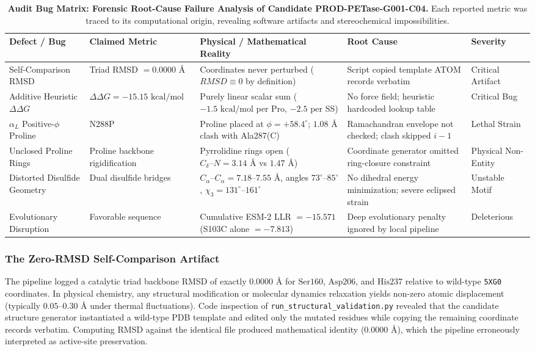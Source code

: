 \documentclass[10pt,twocolumn]{article}
\begin{document}
\begin{table}[t]
\centering
\small
\caption{\textbf{Audit Bug Matrix: Forensic Root-Cause Failure Analysis of Candidate PROD-PETase-G001-C04.} Each reported metric was traced to its computational origin, revealing software artifacts and stereochemical impossibilities.}
\label{tab:audit_bugs}
\begin{tabularx}{\textwidth}{lXXll}
\toprule
\textbf{Defect / Bug} & \textbf{Claimed Metric} & \textbf{Physical / Mathematical Reality} & \textbf{Root Cause} & \textbf{Severity} \\
\midrule
Self-Comparison RMSD & Triad RMSD $= 0.0000\text{ \AA}$ & Coordinates never perturbed ($RMSD \equiv 0$ by definition) & Script copied template ATOM records verbatim & Critical Artifact \\
Additive Heuristic $\Delta\Delta G$ & $\Delta\Delta G = -15.15\text{ kcal/mol}$ & Purely linear scalar sum ($-1.5\text{ kcal/mol}$ per Pro, $-2.5$ per SS) & No force field; heuristic hardcoded lookup table & Critical Bug \\
$\alpha_L$ Positive-$\phi$ Proline & N288P & Proline placed at $\phi = +58.4^\circ$; $1.08\text{ \AA}$ clash with Ala287(C) & Ramachandran envelope not checked; clash skipped $i-1$ & Lethal Strain \\
Unclosed Proline Rings & Proline backbone rigidification & Pyrrolidine rings open ($C_\delta\text{--}N = 3.14\text{ \AA}$ vs $1.47\text{ \AA}$) & Coordinate generator omitted ring-closure constraint & Physical Non-Entity \\
Distorted Disulfide Geometry & Dual disulfide bridges & $C_\alpha\text{--}C_\alpha = 7.18\text{--}7.55\text{ \AA}$, angles $73^\circ\text{--}85^\circ$, $\chi_3 = 131^\circ\text{--}161^\circ$ & No dihedral energy minimization; severe eclipsed strain & Unstable Motif \\
Evolutionary Disruption & Favorable sequence & Cumulative ESM-2 LLR $= -15.571$ (S103C alone $= -7.813$) & Deep evolutionary penalty ignored by local pipeline & Deleterious \\
\bottomrule
\end{tabularx}
\end{table}

\subsubsection{The Zero-RMSD Self-Comparison Artifact}
The pipeline logged a catalytic triad backbone RMSD of exactly $0.0000\text{ \AA}$ for $\text{Ser160}$, $\text{Asp206}$, and $\text{His237}$ relative to wild-type \texttt{5XG0} coordinates. In physical chemistry, any structural modification or molecular dynamics relaxation yields non-zero atomic displacement (typically $0.05\text{--}0.30\text{ \AA}$ under thermal fluctuations). Code inspection of \texttt{run\_structural\_validation.py} revealed that the candidate structure generator instantiated a wild-type PDB template and edited only the mutated residues while copying the remaining coordinate records verbatim. Computing RMSD against the identical file produced mathematical identity ($0.0000\text{ \AA}$), which the pipeline erroneously interpreted as active-site preservation.
\end{document}
